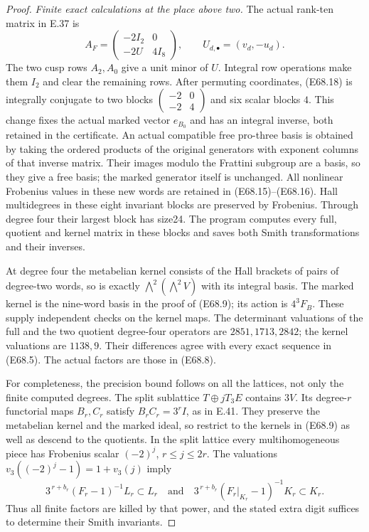 \begin{proof}
\emph{Finite exact calculations at the place above two.}
The actual rank-ten matrix in E.37 is
\[
 A_F=\begin{pmatrix}-2I_2&0\\-2U&4I_8\end{pmatrix},
 \qquad U_{d,\bullet}=(v_d,-u_d).
 \tag{E68.18}
\]
The two cusp rows $A_2,A_0$ give a unit minor of
$U$. Integral row operations make them $I_2$
and clear the remaining rows. After permuting
coordinates, (E68.18) is integrally conjugate to
two blocks
$\left(\begin{smallmatrix}-2&0\\-2&4\end{smallmatrix}\right)$
and six scalar blocks $4$. This change fixes the
actual marked vector $e_{B_0}$ and has an integral
inverse, both retained in the certificate.
An actual compatible free pro-three basis is obtained
by taking the ordered products of the original
generators with exponent columns of that inverse
matrix. Their images modulo the Frattini subgroup
are a basis, so they give a free basis; the marked
generator itself is unchanged. All nonlinear
Frobenius values in these new words are retained
in (E68.15)--(E68.16).
Hall multidegrees in these eight invariant
blocks are preserved by Frobenius. Through
degree four their largest block has size24.
The program computes every full, quotient and
kernel matrix in these blocks and saves both
Smith transformations and their inverses.

At degree four the metabelian kernel consists
of the Hall brackets of pairs of degree-two
words, so is exactly
$\bigwedge^2(\bigwedge^2V)$ with its integral
basis. The marked kernel is the nine-word
basis in the proof of (E68.9); its action is
$4^3F_B$. These supply independent checks
on the kernel maps. The determinant valuations
of the full and the two quotient degree-four
operators are $2851,1713,2842$; the kernel
valuations are $1138,9$. Their differences
agree with every exact sequence in (E68.5).
The actual factors are those in (E68.8).

For completeness, the precision bound follows
on all the lattices, not only the finite
computed degrees. The split sublattice
$T\oplus jT_3E$ contains $3V$.
Its degree-$r$ functorial maps $B_r,C_r$
satisfy $B_rC_r=3^rI$, as in E.41.
They preserve the metabelian kernel and the
marked ideal, so restrict to the kernels in
(E68.9) as well as descend to the quotients.
In the split lattice every multihomogeneous
piece has Frobenius scalar $(-2)^j$,
$r\le j\le2r$. The valuations
$v_3((-2)^j-1)=1+v_3(j)$ imply
\[
 3^{\,r+b_r}(F_r-1)^{-1}L_r\subset L_r
 \quad\text{and}\quad
 3^{\,r+b_r}(F_r|_{K_r}-1)^{-1}K_r\subset K_r .
 \tag{E68.19}
\]
Thus all finite factors are killed by that
power, and the stated extra digit suffices
to determine their Smith invariants.


\end{proof}
